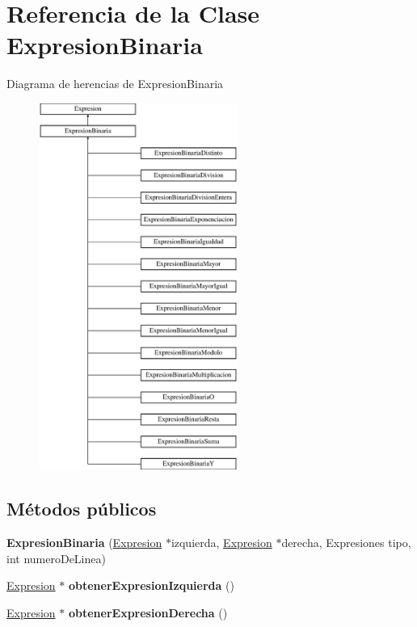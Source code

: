 \hypertarget{class_expresion_binaria}{\section{Referencia de la Clase Expresion\-Binaria}
\label{class_expresion_binaria}
}
Diagrama de herencias de Expresion\-Binaria\begin{figure}[H]
\begin{center}
\leavevmode
\includegraphics[height=12.000000cm]{class_expresion_binaria}
\end{center}
\end{figure}
\subsection*{Métodos públicos}
\begin{DoxyCompactItemize}
\item 
\hypertarget{class_expresion_binaria_a91e06b6736e260ce0c00f3ef1f007ff9}{{\bfseries Expresion\-Binaria} (\hyperlink{class_expresion}{Expresion} $\ast$izquierda, \hyperlink{class_expresion}{Expresion} $\ast$derecha, Expresiones tipo, int numero\-De\-Linea)}\label{class_expresion_binaria_a91e06b6736e260ce0c00f3ef1f007ff9}

\item 
\hypertarget{class_expresion_binaria_aff551bc7f050adefd3a4724c85de8294}{\hyperlink{class_expresion}{Expresion} $\ast$ {\bfseries obtener\-Expresion\-Izquierda} ()}\label{class_expresion_binaria_aff551bc7f050adefd3a4724c85de8294}

\item 
\hypertarget{class_expresion_binaria_a0eeed2c5ffaaa644fe13a194ff5b79e4}{\hyperlink{class_expresion}{Expresion} $\ast$ {\bfseries obtener\-Expresion\-Derecha} ()}\label{class_expresion_binaria_a0eeed2c5ffaaa644fe13a194ff5b79e4}

\end{DoxyCompactItemize}
